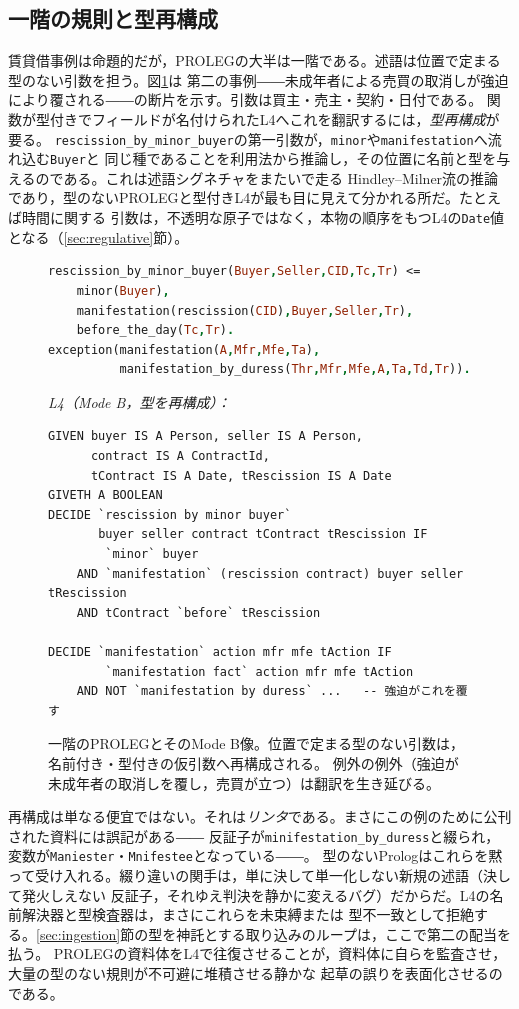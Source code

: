 \documentclass[11pt,a4paper]{ltjsarticle}
\newcommand{\code}[1]{\texttt{\small #1}}
\begin{document}
\subsection{一階の規則と型再構成}
賃貸借事例は命題的だが，PROLEGの大半は一階である。述語は位置で定まる型のない引数を担う。図\ref{fig:minorduress}は
第二の事例――未成年者による売買の取消しが強迫により覆される――の断片を示す。引数は買主・売主・契約・日付である。
関数が型付きでフィールドが名付けられたL4へこれを翻訳するには，\emph{型再構成}が要る。
\code{rescission\_by\_minor\_buyer}の第一引数が，\code{minor}や\code{manifestation}へ流れ込む\code{Buyer}と
同じ種であることを利用法から推論し，その位置に名前と型を与えるのである。これは述語シグネチャをまたいで走る
Hindley--Milner流の推論であり，型のないPROLEGと型付きL4が最も目に見えて分かれる所だ。たとえば時間に関する
引数は，不透明な原子ではなく，本物の順序をもつL4の\code{Date}値となる（\ref{sec:regulative}節）。

\begin{figure}[t]
\begin{lstlisting}[language=Prolog,basicstyle=\ttfamily\footnotesize,keywordstyle=\color{l4kw}\bfseries,commentstyle=\color{l4cmt}\itshape]
rescission_by_minor_buyer(Buyer,Seller,CID,Tc,Tr) <=
    minor(Buyer),
    manifestation(rescission(CID),Buyer,Seller,Tr),
    before_the_day(Tc,Tr).
exception(manifestation(A,Mfr,Mfe,Ta),
          manifestation_by_duress(Thr,Mfr,Mfe,A,Ta,Td,Tr)).
\end{lstlisting}
\noindent\textit{\footnotesize L4（Mode B，型を再構成）：}
\begin{lstlisting}
GIVEN buyer IS A Person, seller IS A Person,
      contract IS A ContractId,
      tContract IS A Date, tRescission IS A Date
GIVETH A BOOLEAN
DECIDE `rescission by minor buyer`
       buyer seller contract tContract tRescission IF
        `minor` buyer
    AND `manifestation` (rescission contract) buyer seller tRescission
    AND tContract `before` tRescission

DECIDE `manifestation` action mfr mfe tAction IF
        `manifestation fact` action mfr mfe tAction
    AND NOT `manifestation by duress` ...   -- 強迫がこれを覆す
\end{lstlisting}
\caption{一階のPROLEGとそのMode B像。位置で定まる型のない引数は，名前付き・型付きの仮引数へ再構成される。
例外の例外（強迫が未成年者の取消しを覆し，売買が立つ）は翻訳を生き延びる。}
\label{fig:minorduress}
\end{figure}

再構成は単なる便宜ではない。それは\emph{リンタ}である。まさにこの例のために公刊された資料には誤記がある――
反証子が\code{minifestation\_by\_duress}と綴られ，変数が\code{Maniester}・\code{Mnifestee}となっている――。
型のないPrologはこれらを黙って受け入れる。綴り違いの関手は，単に決して単一化しない新規の述語（決して発火しえない
反証子，それゆえ判決を静かに変えるバグ）だからだ。L4の名前解決器と型検査器は，まさにこれらを未束縛または
型不一致として拒絶する。\ref{sec:ingestion}節の型を神託とする取り込みのループは，ここで第二の配当を払う。
PROLEGの資料体をL4で往復させることが，資料体に自らを監査させ，大量の型のない規則が不可避に堆積させる静かな
起草の誤りを表面化させるのである。
\end{document}
